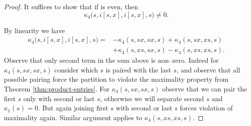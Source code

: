 \documentclass[10pt,a4paper]{amsart}
\begin{document}
\begin{proof}
	
	
It suffices to show that if 
 is even, then 
\begin{equation}\label{k:even}
\kappa_{4}\big(s, i[s, x], i[s, x], s \big) \neq 0. 
\end{equation} 

By linearity we have
\begin{align*}
	\kappa_{4}\big(s, i[s, x], i[s, x], s \big) =&-\kappa_4(s,sx,sx,s)+\kappa_4(s,sx,xs,s)\\ &+\kappa_4(s,xs,sx,s)-\kappa_4(s,xs,xs,s).
\end{align*} 
Observe that only second term in the sum above is non--zero. Indeed for $\kappa_4(s,sx,sx,s)$ consider which $s$ is paired with the last $s$, and observe that all possible pairing force the partition to violate the maximality property from Theorem \ref{thm:product-entries}. For $\kappa_4(s,sx,sx,s)$ observe that we can pair the first $s$ only with second or last $s$, otherwise we will separate second $s$ and $\kappa_1(s)=0$. But again joining first $s$ with second or last $s$ forces violation of maximality again. Similar argument applies to $\kappa_4(s,xs,xs,s)$.


\end{proof}
\end{document}
